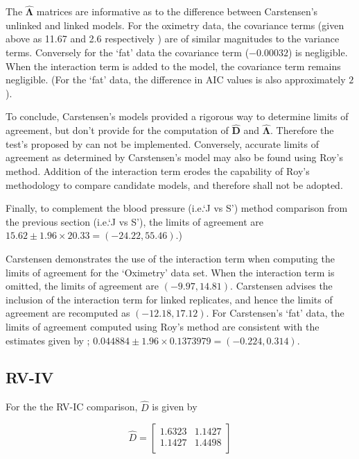 \documentclass[12pt, a4paper]{report}
\theoremstyle{plain}
\theoremstyle{definition}
\theoremstyle{remark}
\begin{document}
		The $\boldsymbol{\hat{\Lambda}}$ matrices are informative as to the difference between Carstensen's unlinked and linked models. For the oximetry data, the covariance terms (given above as 11.67 and 2.6 respectively ) are of similar magnitudes to the variance terms. Conversely for the `fat' data the covariance term ($-0.00032$) is negligible. When the interaction term is added to the model, the covariance term remains negligible. (For the `fat' data, the difference in AIC values is also approximately $2$).
		
		To conclude, Carstensen's models provided a rigorous way to determine limits of agreement, but don't provide for the computation of $\boldsymbol{\hat{D}}$ and $\boldsymbol{\hat{\Lambda}}$. Therefore the test's proposed by \citet{ARoy2009} can not be implemented. Conversely, accurate limits of agreement as determined by Carstensen's model may also be found using Roy's method. Addition of the interaction term erodes the capability of Roy's methodology to compare candidate models, and therefore shall not be adopted.
		
		Finally, to complement the blood pressure (i.e.`J vs S') method comparison from the previous section (i.e.`J vs S'), the limits of agreement are $15.62 \pm 1.96 \times 20.33 = (-24.22, 55.46)$.)
		\newpage
		
	Carstensen demonstrates the use of the interaction term when computing the limits of agreement for the `Oximetry' data set. When the interaction term is omitted, the limits of agreement are $(-9.97, 14.81)$. Carstensen advises the inclusion of the interaction term for linked replicates, and hence the limits of agreement are recomputed as $(-12.18,17.12)$.
	\newpage
	For Carstensen's `fat' data, the limits of agreement computed using Roy's
	method are consistent with the estimates given by \citet{BXC2008}; $0.044884  \pm 1.96 \times  0.1373979 = (-0.224,  0.314).$
	
	\subsection{RV-IV}
	
	For the the RV-IC comparison, $\hat{D}$ is given by
	
	
	\begin{equation}
	\hat{D}= \left[ \begin{array}{cc}
	1.6323 & 1.1427  \\
	1.1427 & 1.4498 \\
	\end{array} \right]
	\end{equation}
	
\end{document}
